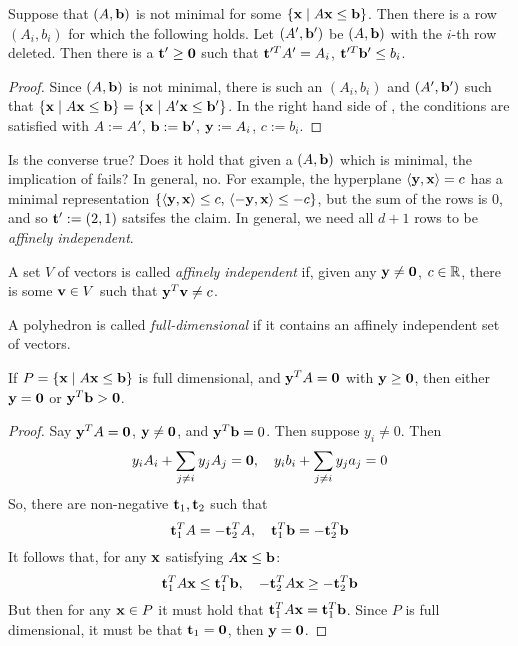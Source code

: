 \begin{Prop}\label{ab_not_minimal}
	Suppose that $(A,\mathbf{b})$ is not minimal for some $\left\{\mathbf{x}\;|\; A\mathbf{x}\leq \mathbf{b}\right\}$.  Then there is a row $(A_i,b_i)$ for which the following holds.  Let $(A',\mathbf{b}')$ be $(A,\mathbf{b})$ with the $i$-th row deleted.  Then there is a $\mathbf{t}'\geq\mathbf{0}$ such that $\mathbf{t}'^T A' = A_i$, $\mathbf{t}'^T \mathbf{b}' \leq b_i$.
\end{Prop}

\begin{proof}
	Since $(A,\mathbf{b})$ is not minimal, there is such an $(A_i,b_i)$ and $(A',\mathbf{b}')$ such that $\left\{\mathbf{x}\;|\; A\mathbf{x}\leq \mathbf{b}\right\} = \left\{\mathbf{x}\;|\; A'\mathbf{x}\leq \mathbf{b}'\right\}$.  In the right hand side of , the conditions are satisfied with $A := A'$, $\mathbf{b} := \mathbf{b}'$, $\mathbf{y} := A_i$, $c := b_i$.
\end{proof}

Is the converse true?  Does it hold that given a $(A,\mathbf{b})$ which is minimal, the implication of  fails?  In general, no.  For example, the hyperplane $\left\langle \mathbf{y}, \mathbf{x} \right\rangle = c$ has a minimal representation $\left\{\left\langle \mathbf{y}, \mathbf{x} \right\rangle\leq c,\,\left\langle -\mathbf{y}, \mathbf{x} \right\rangle\leq -c\right\}$, but the sum of the rows is $0$, and so $\mathbf{t}':= (2,1)$ satsifes the claim.  In general, we need all $d+1$ rows to be \textit{affinely independent}.

\begin{Def}
	A set $V$ of vectors is called \textit{affinely independent} if, given any $\mathbf{y}\neq\mathbf{0}$, $c\in\mathbb{R}$, there is some $\mathbf{v}\in V$ such that $\mathbf{y}^T\mathbf{v} \neq c$.
\end{Def}

\begin{Def}
	A polyhedron is called \textit{full-dimensional} if it contains an affinely independent set of vectors.
\end{Def}

\begin{Prop}\label{ab_full_dim}
	If $P = \left\{\mathbf{x}\;|\; A\mathbf{x}\leq \mathbf{b}\right\}$ is full dimensional, and $\mathbf{y}^T A = \mathbf{0}$ with $\mathbf{y}\geq\mathbf{0}$, then either $\mathbf{y} = \mathbf{0}$ or $\mathbf{y}^T \mathbf{b} > \mathbf{0}$.
\end{Prop}

\begin{proof}
	Say $\mathbf{y}^T A = \mathbf{0}$, $\mathbf{y} \neq \mathbf{0}$, and $\mathbf{y}^T\mathbf{b} = 0$.  Then suppose $y_i \neq 0$.  Then
	\[y_i A_i + \sum_{j\neq i}y_j A_j = \mathbf{0},\quad y_i b_i + \sum_{j\neq i} y_j a_j = 0 \]
	So, there are non-negative $\mathbf{t}_1,\mathbf{t}_2$ such that
	\[\mathbf{t}_1^T A = -\mathbf{t}_2^T A,\quad \mathbf{t}_1^T\mathbf{b} = -\mathbf{t}_2^T\mathbf{b}\]
	It follows that, for any $\mathbf{x}$ satisfying $A\mathbf{x}\leq\mathbf{b}$:
  \[ \mathbf{t}_1^T A\mathbf{x} \leq \mathbf{t}_1^T \mathbf{b},\quad -\mathbf{t}_2^T A\mathbf{x} \geq -\mathbf{t}_2^T \mathbf{b} \]
  But then for any $\mathbf{x}\in P$ it must hold that $\mathbf{t}_1^T A \mathbf{x} = \mathbf{t}_1^T \mathbf{b}$.  Since $P$ is full dimensional, it must be that $\mathbf{t}_1 = \mathbf{0}$, then $\mathbf{y} = \mathbf{0}$.
\end{proof}

